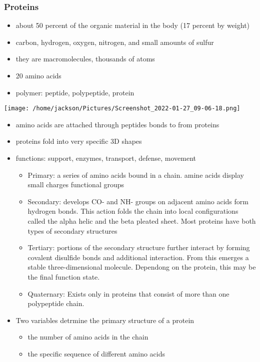 \documentclass[11pt]{article}
\begin{document}
\subsubsection{Proteins}
\label{sec:orgccfa9eb}
\begin{itemize}
\item about 50 percent of the organic material in the body (17 percent by weight)
\item carbon, hydrogen, oxygen, nitrogen, and small amounts of sulfur
\item they are macromolecules, thousands of atoms
\item 20 amino acids
\item polymer: peptide, polypeptide, protein
\end{itemize}
\begin{center}
\texttt{[image: /home/jackson/Pictures/Screenshot\_2022-01-27\_09-06-18.png]}
\end{center}
\begin{itemize}
\item amino acids are attached through peptides bonds to from proteins
\item proteins fold into very specific 3D shapes
\item functions: support, enzymes, transport, defense, movement
\begin{itemize}
\item Primary: a series of amino acids bound in a chain. amine acids display small charges functional groups
\item Secondary: develops CO- and NH- groups on adjacent amino acids form hydrogen bonds. This action folds the chain into local configurations called the alpha helic and the beta pleated sheet. Most proteins have both types of secondary structures
\item Tertiary: portions of the secondary structure further interact by forming covalent disulfide bonds and additional interaction. From this emerges a stable three-dimensional molecule. Dependong on the protein, this may be the final function state.
\item Quaternary: Exists only in proteins that consist of more than one polypeptide chain.
\end{itemize}
\item Two variables detrmine the primary structure of a protein
\begin{itemize}
\item the number of amino acids in the chain
\item the specific sequence of different amino acids
\end{itemize}
\end{itemize}
\end{document}
